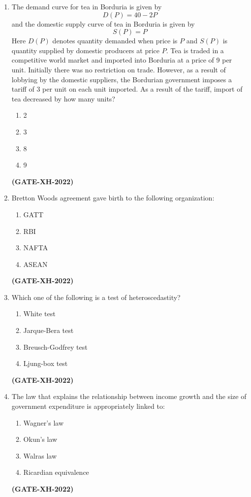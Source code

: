 \documentclass[journal]{IEEEtran}
\begin{document}
\begin{enumerate}
\item The demand curve for tea in Borduria is given by
\[
D(P) = 40-2P
\]
and the domestic supply curve of tea in Borduria is given by
\[
S(P) = P
\]
Here $D(P)$ denotes quantity demanded when price is $P$ and $S(P)$ is quantity supplied by domestic producers at price $P$. Tea is traded in a competitive world market and imported into Borduria at a price of 9 per unit. Initially there was no restriction on trade. However, as a result of lobbying by the domestic suppliers, the Bordurian government imposes a tariff of 3 per unit on each unit imported. As a result of the tariff, import of tea decreased by how many units?
\begin{multicols}{4}
\begin{enumerate}
\item 2
\item 3
\item 8
\item 9
\end{enumerate}
\end{multicols}
\hfill\textbf{(GATE-XH-2022)}
\item Bretton Woods agreement gave birth to the following organization:
\begin{multicols}{2}
\begin{enumerate}
\item GATT
\item RBI
\item NAFTA
\item ASEAN
\end{enumerate}
\end{multicols}
\hfill\textbf{(GATE-XH-2022)}

\item Which one of the following is a test of heteroscedastity?
\begin{multicols}{2}
\begin{enumerate}
\item White test
\item Jarque-Bera test
\item Breusch-Godfrey test
\item Ljung-box test
\end{enumerate}
\end{multicols}
\hfill\textbf{(GATE-XH-2022)}

\item The law that explains the relationship between income growth and the size of government expenditure is appropriately linked to:
\begin{multicols}{2}
\begin{enumerate}
\item Wagner’s law
\item Okun’s law
\item Walras law
\item Ricardian equivalence
\end{enumerate}
\end{multicols}
\hfill\textbf{(GATE-XH-2022)}


\end{enumerate}
\end{document}
